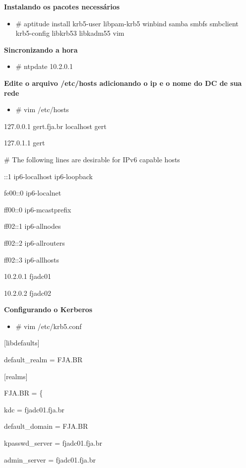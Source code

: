 \textbf{Instalando os pacotes necessários}

\begin{itemize}
	\item {\# aptitude install krb5-user libpam-krb5 winbind samba smbfs smbclient krb5-config libkrb53 libkadm55 vim}
\end{itemize}

\textbf{Sincronizando a hora}

\begin{itemize}
	\item {\# ntpdate 10.2.0.1}
\end{itemize}

\textbf{Edite o arquivo /etc/hosts adicionando o ip e o nome do DC de sua rede}

\begin{itemize}
	\item {\# vim /etc/hosts}
\end{itemize}

127.0.0.1       gert.fja.br localhost gert

127.0.1.1       gert

\# The following lines are desirable for IPv6 capable hosts

::1     ip6-localhost ip6-loopback

fe00::0 ip6-localnet

ff00::0 ip6-mcastprefix

ff02::1 ip6-allnodes

ff02::2 ip6-allrouters

ff02::3 ip6-allhosts

10.2.0.1   fjadc01

10.2.0.2   fjadc02

\textbf{Configurando o Kerberos}

\begin{itemize}
	\item {\# vim /etc/krb5.conf}
\end{itemize}

[libdefaults]

	default\_realm = FJA.BR

[realms]

    FJA.BR = \{

      kdc = fjadc01.fja.br

      default\_domain = FJA.BR

      kpasswd\_server = fjadc01.fja.br

      admin\_server = fjadc01.fja.br

